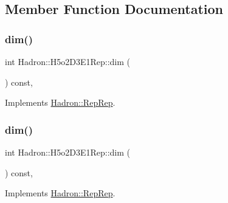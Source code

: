 \subsection{Member Function Documentation}
\mbox{\label{structHadron_1_1H5o2D3E1Rep_a8d8d89d8cfd44d7ac0dc6357bdedd487}} 
\subsubsection{\texorpdfstring{dim()}{dim()}\hspace{0.1cm}{\footnotesize\ttfamily [1/5]}}
{\footnotesize\ttfamily int Hadron\+::\+H5o2\+D3\+E1\+Rep\+::dim (\begin{DoxyParamCaption}{ }\end{DoxyParamCaption}) const\hspace{0.3cm}{\ttfamily [inline]}, {\ttfamily [virtual]}}



Implements \mbox{\hyperlink{structHadron_1_1RepRep_a92c8802e5ed7afd7da43ccfd5b7cd92b}{Hadron\+::\+Rep\+Rep}}.

\mbox{\label{structHadron_1_1H5o2D3E1Rep_a8d8d89d8cfd44d7ac0dc6357bdedd487}} 
\subsubsection{\texorpdfstring{dim()}{dim()}\hspace{0.1cm}{\footnotesize\ttfamily [2/5]}}
{\footnotesize\ttfamily int Hadron\+::\+H5o2\+D3\+E1\+Rep\+::dim (\begin{DoxyParamCaption}{ }\end{DoxyParamCaption}) const\hspace{0.3cm}{\ttfamily [inline]}, {\ttfamily [virtual]}}



Implements \mbox{\hyperlink{structHadron_1_1RepRep_a92c8802e5ed7afd7da43ccfd5b7cd92b}{Hadron\+::\+Rep\+Rep}}.

\mbox{\label{structHadron_1_1H5o2D3E1Rep_a8d8d89d8cfd44d7ac0dc6357bdedd487}} 
